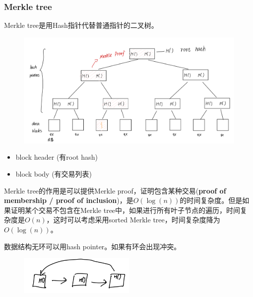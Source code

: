 \documentclass[10pt]{ctexart}
\begin{document}
\subsubsection{Merkle tree}
Merkle tree是用Hash指针代替普通指针的二叉树。
\begin{figure}[H]
    \centering
    \includegraphics[width=1\textwidth]{courses/区块链技术与应用/lecture3/img3.png} 
\end{figure}
\begin{itemize}
    \item block header (有root hash)
    \item block body (有交易列表)
\end{itemize}
Merkle tree的作用是可以提供Merkle proof，证明包含某种交易(\textbf{proof of membership / proof of inclusion})，是$O(\log(n))$的时间复杂度。但是如果证明某个交易不包含在Merkle tree中，如果进行所有叶子节点的遍历，时间复杂度是$O(n)$，这时可以考虑采用sorted Merkle tree，时间复杂度降为$O(\log(n))$。
 
数据结构无环可以用hash pointer。如果有环会出现冲突。
\begin{figure}[H]
    \centering
    \includegraphics[width=0.5\textwidth]{courses/区块链技术与应用/lecture3/img4.png} 
\end{figure}
\end{document}
